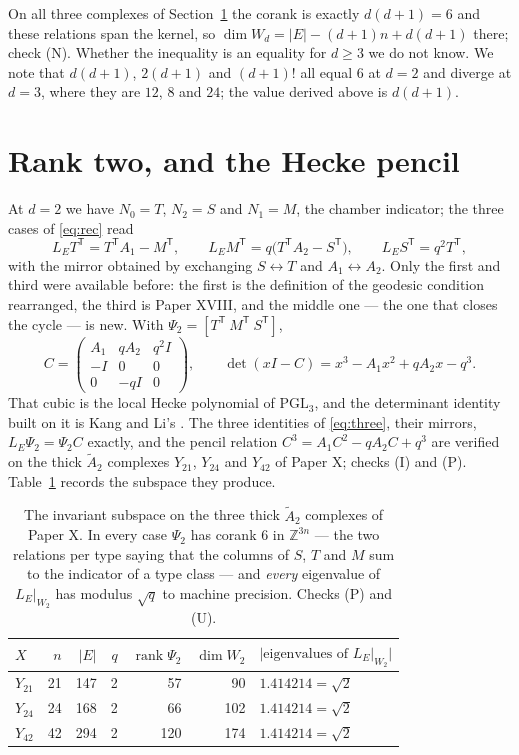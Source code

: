 \documentclass[11pt]{amsart}
\theoremstyle{plain}
\theoremstyle{definition}
\theoremstyle{remark}
\newcommand{\Z}{\mathbb{Z}}
\newcommand{\LE}{L_E}
\newcommand{\Atilde}[1]{\widetilde A_{#1}}
\newcommand{\rank}{\operatorname{rank}}
\newcommand{\tp}{\mathsf{T}}
\begin{document}
On all three complexes of Section~\ref{sec:y} the corank is exactly $d(d+1)=6$ and these
relations span the kernel, so $\dim W_d=|E|-(d+1)n+d(d+1)$ there; check (N). Whether the
inequality is an equality for $d\ge3$ we do not know. We note that $d(d+1)$, $2(d+1)$ and
$(d+1)!$ all equal $6$ at $d=2$ and diverge at $d=3$, where they are $12$, $8$ and $24$; the
value derived above is $d(d+1)$.

\section{Rank two, and the Hecke pencil}\label{sec:y}

At $d=2$ we have $N_0=T$, $N_2=S$ and $N_1=M$, the chamber indicator; the three cases of
\eqref{eq:rec} read
\begin{equation}\label{eq:three}
  \LE T^{\tp}=T^{\tp}A_1-M^{\tp},\qquad
  \LE M^{\tp}=q\bigl(T^{\tp}A_2-S^{\tp}\bigr),\qquad
  \LE S^{\tp}=q^{2}T^{\tp},
\end{equation}
with the mirror obtained by exchanging $S\leftrightarrow T$ and $A_1\leftrightarrow A_2$.
Only the first and third were available before: the first is the definition of the geodesic
condition rearranged, the third is Paper XVIII, and the middle one --- the one that closes
the cycle --- is new. With $\Psi_2=[T^{\tp}\ M^{\tp}\ S^{\tp}]$,
\[
  C=\begin{pmatrix} A_1 & qA_2 & q^{2}I\\ -I & 0 & 0\\ 0 & -qI & 0\end{pmatrix},
  \qquad
  \det(xI-C)=x^{3}-A_1x^{2}+qA_2x-q^{3} .
\]
That cubic is the local Hecke polynomial of $\mathrm{PGL}_3$, and the determinant identity
built on it is Kang and Li's \cite{KL14}. The three identities of \eqref{eq:three}, their
mirrors, $\LE\Psi_2=\Psi_2C$ exactly, and the pencil relation $C^{3}=A_1C^{2}-qA_2C+q^{3}$
are verified on the thick $\Atilde2$ complexes $Y_{21}$, $Y_{24}$ and $Y_{42}$ of Paper X;
checks (I) and (P). Table~\ref{tab:y} records the subspace they produce.

\begin{table}[t]
\centering
\begin{tabular}{lrrrrrl}
\toprule
$X$ & $n$ & $|E|$ & $q$ & $\rank\Psi_2$ & $\dim W_2$ & $|\text{eigenvalues of }\LE|_{W_2}|$\\
\midrule
$Y_{21}$ & 21 & 147 & 2 &  57 &  90 & $1.414214=\sqrt2$\\
$Y_{24}$ & 24 & 168 & 2 &  66 & 102 & $1.414214=\sqrt2$\\
$Y_{42}$ & 42 & 294 & 2 & 120 & 174 & $1.414214=\sqrt2$\\
\bottomrule
\end{tabular}
\caption{The invariant subspace on the three thick $\Atilde2$ complexes of Paper X. In every
case $\Psi_2$ has corank $6$ in $\Z^{3n}$ --- the two relations per type saying that the
columns of $S$, $T$ and $M$ sum to the indicator of a type class --- and \emph{every}
eigenvalue of $\LE|_{W_2}$ has modulus $\sqrt q$ to machine precision. Checks (P) and (U).}
\label{tab:y}
\end{table}
\end{document}
